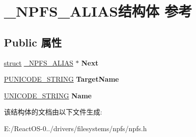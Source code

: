 \hypertarget{struct___n_p_f_s___a_l_i_a_s}{}\section{\+\_\+\+N\+P\+F\+S\+\_\+\+A\+L\+I\+A\+S结构体 参考}
\label{struct___n_p_f_s___a_l_i_a_s}
\subsection*{Public 属性}
\begin{DoxyCompactItemize}
\item 
\mbox{\label{struct___n_p_f_s___a_l_i_a_s_ab0e791b5f3487f56cf943788fb3a1d9b}} 
\hyperlink{interfacestruct}{struct} \hyperlink{struct___n_p_f_s___a_l_i_a_s}{\+\_\+\+N\+P\+F\+S\+\_\+\+A\+L\+I\+AS} $\ast$ {\bfseries Next}
\item 
\mbox{\label{struct___n_p_f_s___a_l_i_a_s_a9fc660b2c2a8836905b4f26d2e3c0c8d}} 
\hyperlink{struct___u_n_i_c_o_d_e___s_t_r_i_n_g}{P\+U\+N\+I\+C\+O\+D\+E\+\_\+\+S\+T\+R\+I\+NG} {\bfseries Target\+Name}
\item 
\mbox{\label{struct___n_p_f_s___a_l_i_a_s_afe650a4bf8893f0eace222f6fc5d85b5}} 
\hyperlink{struct___u_n_i_c_o_d_e___s_t_r_i_n_g}{U\+N\+I\+C\+O\+D\+E\+\_\+\+S\+T\+R\+I\+NG} {\bfseries Name}
\end{DoxyCompactItemize}


该结构体的文档由以下文件生成\+:\begin{DoxyCompactItemize}
\item 
E\+:/\+React\+O\+S-\/0../drivers/filesystems/npfs/npfs.\+h\end{DoxyCompactItemize}

